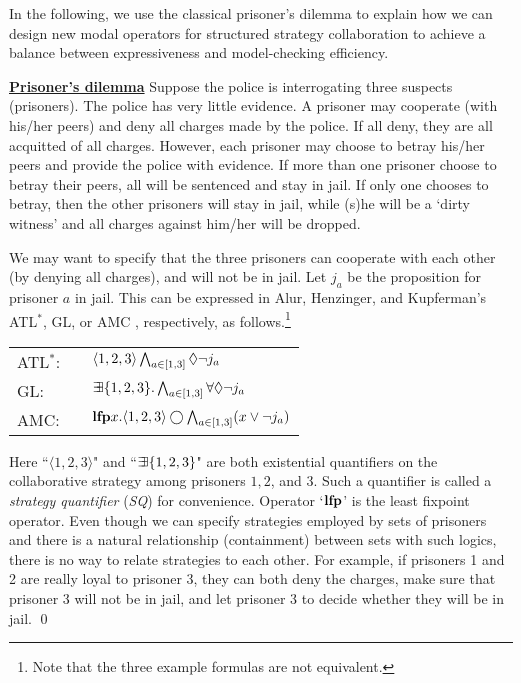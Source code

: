 In the following, we use the classical prisoner's dilemma to explain how we can 
design new modal operators for structured strategy collaboration to 
achieve a balance between expressiveness and model-checking efficiency.

{ \label{exmp.pd} 
\underline{\bf Prisoner's dilemma}} 
Suppose the police is interrogating 
three suspects (prisoners).  
The police has very little evidence.  
A prisoner may cooperate (with his/her peers) and deny all charges made by the police. 
If all deny, they are all acquitted of all charges.  
However, each prisoner may choose to betray his/her peers
and provide the police with evidence.
If more than one prisoner choose to betray their peers, all will be sentenced and stay in jail.
If only one chooses to betray, then the other prisoners will stay in jail, while (s)he will be a `dirty witness' and all charges against him/her will be dropped.

We may want to specify that the three prisoners can cooperate with each other (by denying all charges), and will not be in jail.  
Let $j_a$ be the proposition for prisoner $a$ in jail.  
This can be expressed in Alur, Henzinger, and Kupferman's 
ATL$^*$,  
GL, or AMC \cite{AHK02}, respectively, as follows.\footnote{Note 
that the three example formulas are not equivalent.}  
\begin{center} 
\begin{tabular}{lll} 
ATL$^*$: 
& &  $\langle 1,2,3\rangle\bigwedge_{a\in[1,3]}\Diamond \neg j_a$ \\
GL: 
& & $\mbox{$\exists\!\!\exists$}\{1,2,3\}.\bigwedge_{a\in[1,3]}\forall\Diamond\neg j_a$ \\
AMC: 
& & $\mbox{\bf lfp} x.\langle 1,2,3\rangle \bigcirc 
\bigwedge_{a\in[1,3]}(x\vee \neg j_a)$
\end{tabular} 
\end{center} 
Here ``$\langle 1,2,3\rangle$" and 
``$\mbox{$\exists\!\!\exists$}\{1,2,3\}$" are both existential 
quantifiers on the collaborative strategy among prisoners $1,2$, and $3$.  
Such a quantifier is called a {\em strategy quantifier} ({\em SQ}) 
for convenience.  
Operator `$\mbox{\bf lfp}$' is the least fixpoint operator.  
Even though we can specify strategies employed by sets of prisoners and 
there is a natural relationship (containment) between sets with such logics, 
there is no way to relate strategies to each other.  
For example, if prisoners 1 and 2 are really loyal to prisoner 3, 
they can both deny the charges,  
make sure that prisoner 3 will not be in jail, and let prisoner 3 
to decide whether they will be in jail. 
\qed 

